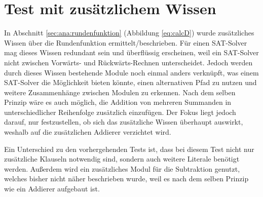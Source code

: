 \section{Test mit zusätzlichem Wissen} %
\label{sec:test_knowledge}

In Abschnitt \ref{sec:ana:rundenfunktion} (Abbildung \ref{eq:calcD}) wurde zusätzliches Wissen über die Rundenfunktion ermittelt/beschrieben.
Für einen SAT-Solver mag dieses Wissen redundant sein und überflüssig erscheinen, weil ein SAT-Solver nicht zwischen Vorwärts- und Rückwärts-Rechnen
unterscheidet. Jedoch werden durch dieses Wissen bestehende Module noch einmal anders verknüpft, was einem SAT-Solver die Möglichkeit bieten könnte,
einen alternativen Pfad zu nutzen und weitere Zusammenhänge zwischen Modulen zu erkennen. Nach dem selben Prinzip wäre es auch möglich, die Addition
von mehreren Summanden in unterschiedlicher Reihenfolge zusätzlich einzufügen. Der Fokus liegt jedoch darauf, nur festzustellen, ob sich das
zusätzliche Wissen überhaupt auswirkt, weshalb auf die zusätzlichen Addierer verzichtet wird.

Ein Unterschied zu den vorhergehenden Tests ist, dass bei diesem Test nicht nur zusätzliche Klauseln notwendig sind, sondern auch weitere Literale
benötigt werden. Außerdem wird ein zusätzliches Modul für die Subtraktion genutzt, welches bisher nicht näher beschrieben wurde, weil es nach dem selben
Prinzip wie ein Addierer aufgebaut ist.

